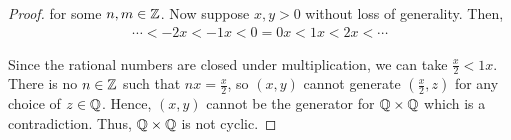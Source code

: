 \documentclass[11pt, reqno]{amsart}
\theoremstyle{plain}
\theoremstyle{definition}
\theoremstyle{example}
\begin{document}
\begin{enumerate}[1.]
\begin{enumerate}
\begin{proof}
for some $n, m \in \mathbb{Z}$. Now suppose $x, y > 0$ without loss of generality. Then,
\begin{align*}
\cdots < -2x < -1x < 0 = 0x < 1x < 2x < \cdots 
\end{align*}

Since the rational numbers are closed under multiplication, we can take $\frac{x}{2} < 1x$. There is no $n \in \mathbb{Z}$ such that $nx = \frac{x}{2}$, so $(x, y)$ cannot generate $(\frac{x}{2}, z)$ for any choice of $z \in \mathbb{Q}$. Hence, $(x, y)$ cannot be the generator for $\mathbb{Q} \times \mathbb{Q}$ which is a contradiction. Thus, $\mathbb{Q} \times \mathbb{Q}$ is not cyclic.
\end{proof}
\end{enumerate}


\end{enumerate}
\end{document}
